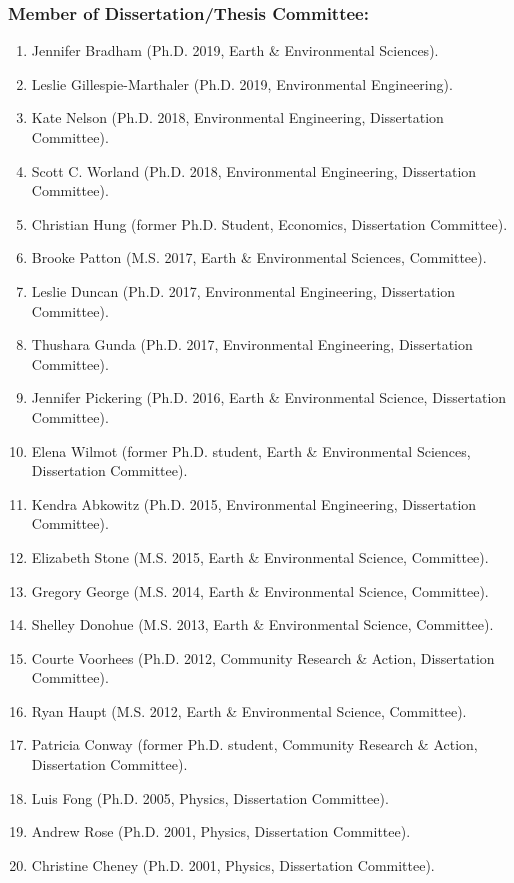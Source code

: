 \documentclass[10pt]{article}
\begin{document}
    \subsubsection{Member of Dissertation/Thesis Committee:}
    \begin{enumerate}
    \item Jennifer Bradham (Ph.D. 2019, Earth \& Environmental Sciences).
    \item Leslie Gillespie-Marthaler (Ph.D. 2019, Environmental Engineering).
    \item Kate Nelson (Ph.D. 2018, Environmental Engineering, Dissertation Committee).
    \item Scott C. Worland (Ph.D. 2018, Environmental Engineering, Dissertation Committee).
    \item Christian Hung (former Ph.D. Student, Economics, Dissertation Committee).
    \item Brooke Patton (M.S. 2017, Earth \& Environmental Sciences, Committee).
    \item Leslie Duncan (Ph.D. 2017, Environmental Engineering, Dissertation Committee).
    \item Thushara Gunda (Ph.D. 2017, Environmental Engineering, Dissertation Committee).
    \item Jennifer Pickering (Ph.D. 2016, Earth \& Environmental Science, Dissertation Committee).
    \item Elena Wilmot (former Ph.D. student, Earth \& Environmental Sciences, Dissertation Committee).
    \item Kendra Abkowitz (Ph.D. 2015, Environmental Engineering, Dissertation Committee).
    \item Elizabeth Stone (M.S. 2015, Earth \& Environmental Science, Committee).
    \item Gregory George (M.S. 2014, Earth \& Environmental Science, Committee).
    \item Shelley Donohue (M.S. 2013, Earth \& Environmental Science, Committee).
    \item Courte Voorhees (Ph.D. 2012,  Community Research \& Action, Dissertation Committee).
    \item Ryan Haupt (M.S. 2012, Earth \& Environmental Science, Committee).
    \item Patricia Conway (former Ph.D. student, Community Research \& Action, Dissertation Committee).
    \item Luis Fong (Ph.D. 2005, Physics, Dissertation Committee).
    \item Andrew Rose (Ph.D. 2001, Physics, Dissertation Committee).
    \item Christine Cheney (Ph.D. 2001, Physics, Dissertation Committee).
    \end{enumerate}
\end{document}

